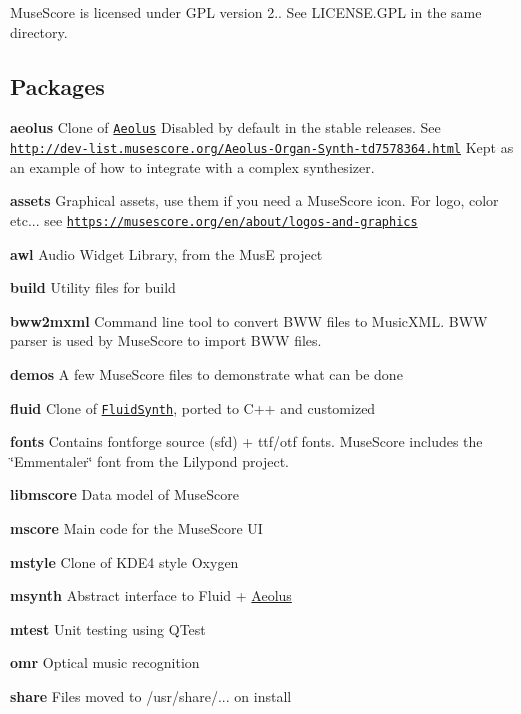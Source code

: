 Muse\+Score is licensed under G\+PL version 2.. See L\+I\+C\+E\+N\+S\+E.\+G\+PL in the same directory.

\subsection*{Packages}


\begin{DoxyItemize}
\item {\bfseries aeolus} Clone of \href{http://kokkinizita.linuxaudio.org/linuxaudio/aeolus/}{\tt Aeolus} Disabled by default in the stable releases. See \href{http://dev-list.musescore.org/Aeolus-Organ-Synth-td7578364.html}{\tt http\+://dev-\/list.\+musescore.\+org/\+Aeolus-\/\+Organ-\/\+Synth-\/td7578364.\+html} Kept as an example of how to integrate with a complex synthesizer.
\item {\bfseries assets} Graphical assets, use them if you need a Muse\+Score icon. For logo, color etc... see \href{https://musescore.org/en/about/logos-and-graphics}{\tt https\+://musescore.\+org/en/about/logos-\/and-\/graphics}
\item {\bfseries awl} Audio Widget Library, from the MusE project
\item {\bfseries build} Utility files for build
\item {\bfseries bww2mxml} Command line tool to convert B\+WW files to Music\+X\+ML. B\+WW parser is used by Muse\+Score to import B\+WW files.
\item {\bfseries demos} A few Muse\+Score files to demonstrate what can be done
\item {\bfseries fluid} Clone of \href{https://sourceforge.net/projects/fluidsynth/}{\tt Fluid\+Synth}, ported to C++ and customized
\item {\bfseries fonts} Contains fontforge source (sfd) + ttf/otf fonts. Muse\+Score includes the \char`\"{}\+Emmentaler\char`\"{} font from the Lilypond project.
\item {\bfseries libmscore} Data model of Muse\+Score
\item {\bfseries mscore} Main code for the Muse\+Score UI
\item {\bfseries mstyle} Clone of K\+D\+E4 style Oxygen
\item {\bfseries msynth} Abstract interface to Fluid + \hyperlink{class_aeolus}{Aeolus}
\item {\bfseries mtest} Unit testing using Q\+Test
\item {\bfseries omr} Optical music recognition
\item {\bfseries share} Files moved to /usr/share/... on install

\end{DoxyItemize}
